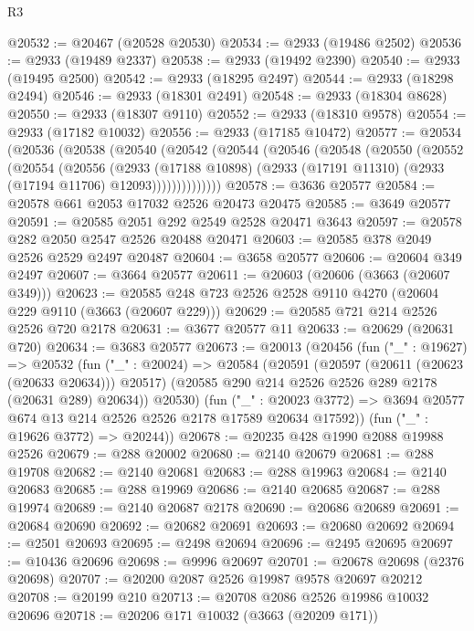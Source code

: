 \begin{lexlean}{R3}
\begin{coremodule}
@20532 := @20467 (@20528 @20530)
@20534 := @2933 (@19486 @2502)
@20536 := @2933 (@19489 @2337)
@20538 := @2933 (@19492 @2390)
@20540 := @2933 (@19495 @2500)
@20542 := @2933 (@18295 @2497)
@20544 := @2933 (@18298 @2494)
@20546 := @2933 (@18301 @2491)
@20548 := @2933 (@18304 @8628)
@20550 := @2933 (@18307 @9110)
@20552 := @2933 (@18310 @9578)
@20554 := @2933 (@17182 @10032)
@20556 := @2933 (@17185 @10472)
@20577 := @20534
    (@20536
      (@20538
        (@20540
          (@20542
            (@20544
              (@20546
                (@20548
                  (@20550
                    (@20552
                      (@20554
                        (@20556
                          (@2933
                            (@17188 @10898)
                            (@2933 (@17191 @11310) (@2933 (@17194 @11706) @12093))))))))))))))
@20578 := @3636 @20577
@20584 := @20578 @661 @2053 @17032 @2526 @20473 @20475
@20585 := @3649 @20577
@20591 := @20585 @2051 @292 @2549 @2528 @20471 @3643
@20597 := @20578 @282 @2050 @2547 @2526 @20488 @20471
@20603 := @20585 @378 @2049 @2526 @2529 @2497 @20487
@20604 := @3658 @20577
@20606 := @20604 @349 @2497
@20607 := @3664 @20577
@20611 := @20603 (@20606 (@3663 (@20607 @349)))
@20623 := @20585 @248 @723 @2526 @2528 @9110 @4270 (@20604 @229 @9110 (@3663 (@20607 @229)))
@20629 := @20585 @721 @214 @2526 @2526 @720 @2178
@20631 := @3677 @20577 @11
@20633 := @20629 (@20631 @720)
@20634 := @3683 @20577
@20673 := @20013
    (@20456
      (fun ("_" : @19627) =>
      @20532
        (fun ("_" : @20024) =>
        @20584
          (@20591
            (@20597 (@20611 (@20623 (@20633 @20634))) @20517)
            (@20585 @290 @214 @2526 @2526 @289 @2178 (@20631 @289) @20634))
          @20530)
        (fun ("_" : @20023 @3772) =>
        @3694 @20577 @674 @13 @214 @2526 @2526 @2178 @17589 @20634 @17592))
      (fun ("_" : @19626 @3772) => @20244))
@20678 := @20235 @428 @1990 @2088 @19988 @2526
@20679 := @288 @20002
@20680 := @2140 @20679
@20681 := @288 @19708
@20682 := @2140 @20681
@20683 := @288 @19963
@20684 := @2140 @20683
@20685 := @288 @19969
@20686 := @2140 @20685
@20687 := @288 @19974
@20689 := @2140 @20687 @2178
@20690 := @20686 @20689
@20691 := @20684 @20690
@20692 := @20682 @20691
@20693 := @20680 @20692
@20694 := @2501 @20693
@20695 := @2498 @20694
@20696 := @2495 @20695
@20697 := @10436 @20696
@20698 := @9996 @20697
@20701 := @20678 @20698 (@2376 @20698)
@20707 := @20200 @2087 @2526 @19987 @9578 @20697 @20212
@20708 := @20199 @210
@20713 := @20708 @2086 @2526 @19986 @10032 @20696
@20718 := @20206 @171 @10032 (@3663 (@20209 @171))

\end{coremodule}
\end{lexlean}
